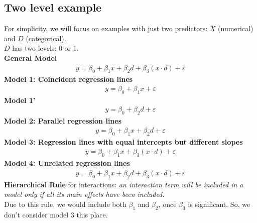 \documentclass[11pt,a4paper]{article}
\begin{document}
\subsection{Two level example}
For simplicity, we will focus on examples with just two predictors:
$X$ (numerical) and $D$ (categorical).\\
$D$ has two levels: 0 or 1.\\
\textbf{General Model}
\begin{equation}
    \begin{aligned}
        y = \beta_0 + \beta_1 x + \beta_2 d + \beta_3 (x\cdot d) + \varepsilon
    \end{aligned}
    \nonumber
\end{equation}
\textbf{Model 1: Coincident regression lines}
\begin{equation}
    \begin{aligned}
        y = \beta_0 + \beta_1 x + \varepsilon
    \end{aligned}
    \nonumber
\end{equation}
\textbf{Model 1'}
\begin{equation}
    \begin{aligned}
        y = \beta_0 + \beta_2 d  + \varepsilon
    \end{aligned}
    \nonumber
\end{equation}
\textbf{Model 2: Parallel regression lines}
\begin{equation}
    \begin{aligned}
        y = \beta_0 + \beta_1 x+ \beta_2 d + \varepsilon
    \end{aligned}
    \nonumber
\end{equation}
\textbf{Model 3: Regression lines with equal intercepts but different slopes}
\begin{equation}
    \begin{aligned}
        y = \beta_0 + \beta_1 x + \beta_3 (x\cdot d) + \varepsilon
    \end{aligned}
    \nonumber
\end{equation}
\textbf{Model 4: Unrelated regression lines}
\begin{equation}
    \begin{aligned}
        y = \beta_0 + \beta_1 x + \beta_2 d + \beta_3 (x\cdot d) + \varepsilon
    \end{aligned}
    \nonumber
\end{equation}
\textbf{Hierarchical Rule} for interactions:
\textit{an interaction term will be included in a model only if all its main effects have been included.}\\
Due to this rule, we would include both $\beta_1$ and $\beta_2$, once $\beta_3$ is significant. So, we don't consider model 3 this place.\\
\end{document}
